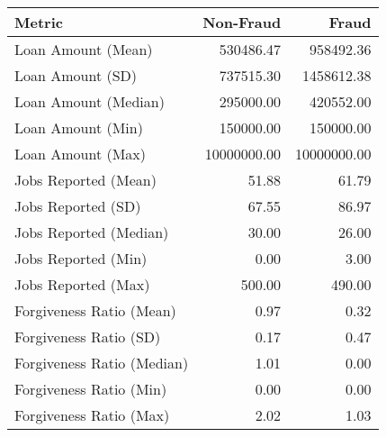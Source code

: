 \begin{tabular}{lrr}
\toprule
Metric & Non-Fraud & Fraud \\
\midrule
Loan Amount (Mean) & 530486.47 & 958492.36 \\
Loan Amount (SD) & 737515.30 & 1458612.38 \\
Loan Amount (Median) & 295000.00 & 420552.00 \\
Loan Amount (Min) & 150000.00 & 150000.00 \\
Loan Amount (Max) & 10000000.00 & 10000000.00 \\
Jobs Reported (Mean) & 51.88 & 61.79 \\
Jobs Reported (SD) & 67.55 & 86.97 \\
Jobs Reported (Median) & 30.00 & 26.00 \\
Jobs Reported (Min) & 0.00 & 3.00 \\
Jobs Reported (Max) & 500.00 & 490.00 \\
Forgiveness Ratio (Mean) & 0.97 & 0.32 \\
Forgiveness Ratio (SD) & 0.17 & 0.47 \\
Forgiveness Ratio (Median) & 1.01 & 0.00 \\
Forgiveness Ratio (Min) & 0.00 & 0.00 \\
Forgiveness Ratio (Max) & 2.02 & 1.03 \\
\bottomrule
\end{tabular}
